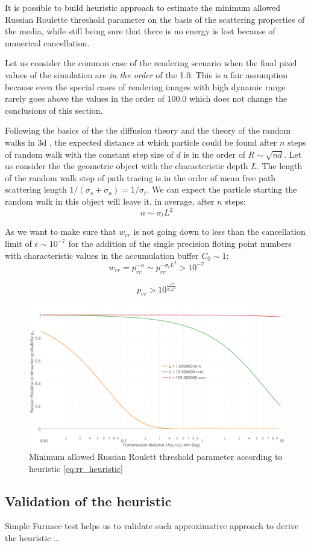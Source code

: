 It is possible to build heuristic approach to estimate the minimum allowed Russian Roulette
threshold parameter on the basis of the scattering properties of the media, while still being sure
that there is no energy is lost because of numerical cancellation.

Let us consider the common case of the rendering scenario when the final pixel values of the
simulation are \emph{in the order} of the 1.0. This is a fair assumption because even the special
cases of rendering images with high dynamic range rarely goes above the values in the order of 100.0
which does not change the conclusions of this section.

Following the basics of the the diffusion theory and the theory of the random walks in 3d
\cite{PRE:8383976}, the expected distance at which particle could be found after $n$ steps of random
walk with the constant step size of $d$ is in the order of $R\sim\sqrt{nd}$. Let us consider the the
geometric object with the characteristic depth $L$. The length of the random walk step of path
tracing is in the order of mean free path scattering length $1/(\sigma_s+\sigma_a)=1/\sigma_t$. We
can expect the particle starting the random walk in this object will leave it, in average, after $n$
steps:
\begin{equation}
n\sim\sigma_tL^2
\end{equation}

As we want to make sure that $w_{rr}$ is not going down to less than the cancellation limit of
$\epsilon\sim10^{-7}$ for the addition of the single precision floting point numbers with
characteristic values in the accumulation buffer $C_0\sim1$:
\[
w_{rr} = p_{rr}^{-n} \sim p_{rr}^{-\sigma_tL^2} > 10^{-7}
\]

\begin{equation}
\label{eq:rr_heuristic}
p_{rr} > 10^{\frac{-7}{\sigma_tL^2}}
\end{equation}

\begin{figure}[h]
    \centering
    \includegraphics[width=\textwidth]{imgs/plots/rr_heuristic}
    \caption{Minimum allowed Russian Roulett threshold parameter according to heuristic \ref{eq:rr_heuristic}}
    \label{fig:rr_heuristic}
\end{figure}

\subsection{Validation of the heuristic}
Simple Furnace test helps us to validate such approximative approach to derive the heuristic
\ldots

